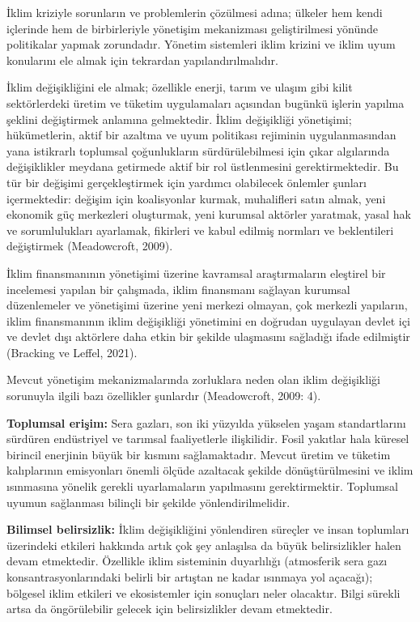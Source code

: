 \documentclass[
]{book}
\begin{document}
İklim kriziyle sorunların ve problemlerin çözülmesi adına; ülkeler hem kendi içlerinde hem de birbirleriyle yönetişim mekanizması geliştirilmesi yönünde politikalar yapmak zorundadır. Yönetim sistemleri iklim krizini ve iklim uyum konularını ele almak için tekrardan yapılandırılmalıdır.

İklim değişikliğini ele almak; özellikle enerji, tarım ve ulaşım gibi kilit sektörlerdeki üretim ve tüketim uygulamaları açısından bugünkü işlerin yapılma şeklini değiştirmek anlamına gelmektedir. İklim değişikliği yönetişimi; hükümetlerin, aktif bir azaltma ve uyum politikası rejiminin uygulanmasından yana istikrarlı toplumsal çoğunlukların sürdürülebilmesi için çıkar algılarında değişiklikler meydana getirmede aktif bir rol üstlenmesini gerektirmektedir. Bu tür bir değişimi gerçekleştirmek için yardımcı olabilecek önlemler şunları içermektedir: değişim için koalisyonlar kurmak, muhalifleri satın almak, yeni ekonomik güç merkezleri oluşturmak, yeni kurumsal aktörler yaratmak, yasal hak ve sorumlulukları ayarlamak, fikirleri ve kabul edilmiş normları ve beklentileri değiştirmek (Meadowcroft, 2009).

İklim finansmanının yönetişimi üzerine kavramsal araştırmaların eleştirel bir incelemesi yapılan bir çalışmada, iklim finansmanı sağlayan kurumsal düzenlemeler ve yönetişimi üzerine yeni merkezi olmayan, çok merkezli yapıların, iklim finansmanının iklim değişikliği yönetimini en doğrudan uygulayan devlet içi ve devlet dışı aktörlere daha etkin bir şekilde ulaşmasını sağladığı ifade edilmiştir (Bracking ve Leffel, 2021).

Mevcut yönetişim mekanizmalarında zorluklara neden olan iklim değişikliği sorunuyla ilgili bazı özellikler şunlardır (Meadowcroft, 2009: 4).

\textbf{Toplumsal erişim:} Sera gazları, son iki yüzyılda yükselen yaşam standartlarını sürdüren endüstriyel ve tarımsal faaliyetlerle ilişkilidir. Fosil yakıtlar hala küresel birincil enerjinin büyük bir kısmını sağlamaktadır. Mevcut üretim ve tüketim kalıplarının emisyonları önemli ölçüde azaltacak şekilde dönüştürülmesini ve iklim ısınmasına yönelik gerekli uyarlamaların yapılmasını gerektirmektir. Toplumsal uyumun sağlanması bilinçli bir şekilde yönlendirilmelidir.

\textbf{Bilimsel belirsizlik:} İklim değişikliğini yönlendiren süreçler ve insan toplumları üzerindeki etkileri hakkında artık çok şey anlaşılsa da büyük belirsizlikler halen devam etmektedir. Özellikle iklim sisteminin duyarlılığı (atmosferik sera gazı konsantrasyonlarındaki belirli bir artıştan ne kadar ısınmaya yol açacağı); bölgesel iklim etkileri ve ekosistemler için sonuçları neler olacaktır. Bilgi sürekli artsa da öngörülebilir gelecek için belirsizlikler devam etmektedir.
\end{document}
